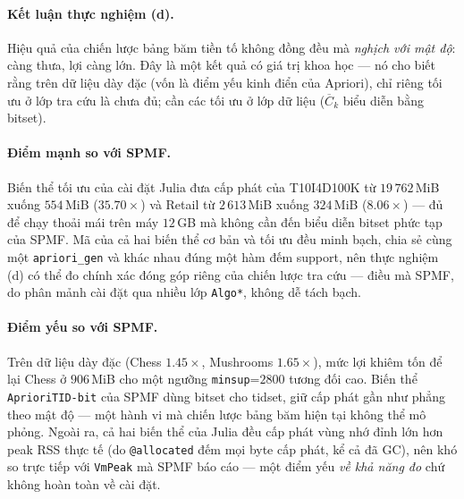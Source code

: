 \paragraph{Kết luận thực nghiệm (d).} Hiệu quả của chiến lược bảng băm tiền tố không đồng đều mà \emph{nghịch với mật độ}: càng thưa, lợi càng lớn. Đây là một kết quả có giá trị khoa học --- nó cho biết rằng trên dữ liệu dày đặc (vốn là điểm yếu kinh điển của Apriori), chỉ riêng tối ưu ở lớp tra cứu là chưa đủ; cần các tối ưu ở lớp dữ liệu ($\overline{C}_k$ biểu diễn bằng bitset).

\paragraph{Điểm mạnh so với SPMF.} Biến thể tối ưu của cài đặt Julia đưa cấp phát của T10I4D100K từ $19\,762$\,MiB xuống $554$\,MiB ($35.70\times$) và Retail từ $2\,613$\,MiB xuống $324$\,MiB ($8.06\times$) --- đủ để chạy thoải mái trên máy $12$\,GB mà không cần đến biểu diễn bitset phức tạp của SPMF. Mã của cả hai biến thể cơ bản và tối ưu đều minh bạch, chia sẻ cùng một \texttt{apriori\_gen} và khác nhau đúng một hàm đếm support, nên thực nghiệm (d) có thể đo chính xác đóng góp riêng của chiến lược tra cứu --- điều mà SPMF, do phân mảnh cài đặt qua nhiều lớp \texttt{Algo*}, không dễ tách bạch.

\paragraph{Điểm yếu so với SPMF.} Trên dữ liệu dày đặc (Chess $1.45\times$, Mushrooms $1.65\times$), mức lợi khiêm tốn để lại Chess ở $906$\,MiB cho một ngưỡng \texttt{minsup}=$2800$ tương đối cao. Biến thể \texttt{AprioriTID-bit} của SPMF dùng bitset cho tidset, giữ cấp phát gần như phẳng theo mật độ --- một hành vi mà chiến lược bảng băm hiện tại không thể mô phỏng. Ngoài ra, cả hai biến thể của Julia đều cấp phát vùng nhớ đỉnh lớn hơn peak RSS thực tế (do \texttt{@allocated} đếm mọi byte cấp phát, kể cả đã GC), nên khó so trực tiếp với \texttt{VmPeak} mà SPMF báo cáo --- một điểm yếu \emph{về khả năng đo} chứ không hoàn toàn về cài đặt.

